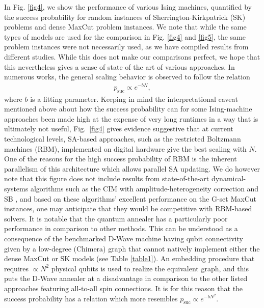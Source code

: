 \documentclass[fleqn,10pt]{wlscirep}
\def\change#1{#1}
\begin{document}
In Fig. \ref{fig4}, we show the performance of various Ising machines, quantified by the success probability for random instances of Sherrington-Kirkpatrick (SK) problems and dense MaxCut problem instances.  %
We note that while the same types of models are used for the comparison in Fig.  \ref{fig4} and  \ref{fig5},  the same problem instances were not necessarily used, as we have compiled results from different studies. While this does not make our comparisons perfect, we hope that this nevertheless gives a sense of state of the art of various approaches. In numerous works,  the general scaling behavior is observed to follow the relation
%
\begin{align}
    p_{\text{suc}} \propto e^{-b N} ,
\end{align}
%
where $ b $ is a fitting parameter. Keeping in mind the interpretational caveat mentioned above about how the success probability can for some Ising-machine approaches been made high at the expense of very long runtimes in a way that is ultimately not useful, Fig.~\ref{fig4} gives evidence suggestive that at current technological levels, \change{SA}-based approaches, such as the restricted Boltzmann machines (RBM), implemented on digital hardware give the best scaling with $ N $.  One of the reasons for the high success probability of RBM is the inherent parallelism of this architecture which allows parallel SA updating. %
\change{We do however note that this figure does not include results from state-of-the-art dynamical-systems algorithms such as the CIM with amplitude-heterogeneity correction \cite{leleu2019destabilization,leleu2020chaotic} and SB \cite{goto2021high}, and based on these algorithms' excellent performance on the G-set MaxCut instances, one may anticipate that they would be competitive with RBM-based solvers. }
It is notable that the quantum annealer has a particularly poor performance in comparison to other methods.  This can be understood\cite{hamerly2019experimental} as a consequence of the benchmarked D-Wave machine having qubit connectivity given by a low-degree (Chimera) graph that cannot natively implement either the dense MaxCut or SK models (see Table \ref{table1}).  An embedding procedure that requires $ \propto N^2$ physical qubits is used to realize the equivalent graph, and this puts the D-Wave annealer at a disadvantage in comparison to the other listed approaches featuring all-to-all spin connections.  It is for this reason that the success probability has a relation which more resembles $ p_{\text{suc}} \propto e^{-b N^2} $.  
\end{document}
